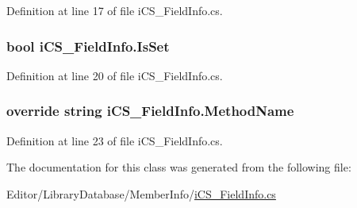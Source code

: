 Definition at line 17 of file i\+C\+S\+\_\+\+Field\+Info.\+cs.

\hypertarget{classi_c_s___field_info_ac8cf221caf63b121284558b8e6916def}{
\subsubsection[{Is\+Set}]{\setlength{\rightskip}{0pt plus 5cm}bool i\+C\+S\+\_\+\+Field\+Info.\+Is\+Set\hspace{0.3cm}{\ttfamily [get]}}}\label{classi_c_s___field_info_ac8cf221caf63b121284558b8e6916def}


Definition at line 20 of file i\+C\+S\+\_\+\+Field\+Info.\+cs.

\hypertarget{classi_c_s___field_info_a0ad07f85cf3066f3a5e409031a59b3ae}{
\subsubsection[{Method\+Name}]{\setlength{\rightskip}{0pt plus 5cm}override string i\+C\+S\+\_\+\+Field\+Info.\+Method\+Name\hspace{0.3cm}{\ttfamily [get]}}}\label{classi_c_s___field_info_a0ad07f85cf3066f3a5e409031a59b3ae}


Definition at line 23 of file i\+C\+S\+\_\+\+Field\+Info.\+cs.



The documentation for this class was generated from the following file\+:\begin{DoxyCompactItemize}
\item 
Editor/\+Library\+Database/\+Member\+Info/\hyperlink{i_c_s___field_info_8cs}{i\+C\+S\+\_\+\+Field\+Info.\+cs}\end{DoxyCompactItemize}
